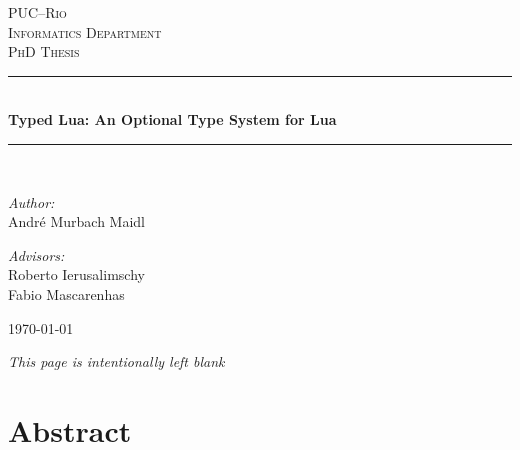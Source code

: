 \documentclass[pdftex,12pt,a4paper]{report}
\begin{document}
\begin{titlepage}
\begin{center}

\textsc{\LARGE PUC--Rio}\\[1.5cm]
\textsc{\Large Informatics Department}\\[1.0cm]
\textsc{\Large PhD Thesis}\\[0.5cm]

\newcommand{\HRule}{\rule{\linewidth}{0.5mm}}
\HRule \\[0.4cm]
{\huge \bfseries Typed Lua: An Optional Type System for Lua}\\[0.4cm]
\HRule \\[1.5cm]

\begin{minipage}{0.4\textwidth}
\begin{flushleft} \large
\emph{Author:}\\
André Murbach Maidl
\end{flushleft}
\end{minipage}
\begin{minipage}{0.4\textwidth}
\begin{flushright} \large
\emph{Advisors:} \\
Roberto Ierusalimschy \\
Fabio Mascarenhas
\end{flushright}
\end{minipage}

\vfill
{\large \today}

\end{center}
\end{titlepage}

\newpage
\thispagestyle{empty}
\textit{This page is intentionally left blank}

\newpage
\setcounter{page}{1}

\tableofcontents

\listoffigures
{}

\listoftables
{}


\chapter*{Abstract}

\end{document}
